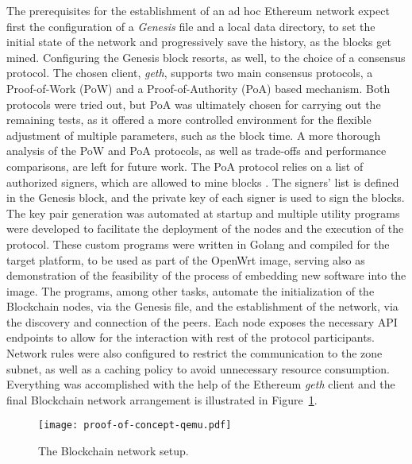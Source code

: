 The prerequisites for the establishment of an ad hoc Ethereum network expect first the configuration of a \emph{Genesis} file and a local data directory, to set the initial state of the network and progressively save the history, as the blocks get mined. Configuring the Genesis block resorts, as well, to the choice of a consensus protocol. The chosen client, \emph{geth}, supports two main consensus protocols, a Proof-of-Work (PoW) and a Proof-of-Authority (PoA) based mechanism. Both protocols were tried out, but PoA was ultimately chosen for carrying out the remaining tests, as it offered a more controlled environment for the flexible adjustment of multiple parameters, such as the block time. A more thorough analysis of the PoW and PoA protocols, as well as trade-offs and performance comparisons, are left for future work. The PoA protocol relies on a list of authorized signers, which are allowed to mine blocks \cite{clique-eth}. The signers' list is defined in the Genesis block, and the private key of each signer is used to sign the blocks. The key pair generation was automated at startup and multiple utility programs were developed to facilitate the deployment of the nodes and the execution of the protocol. These custom programs were written in Golang and compiled for the target platform, to be used as part of the OpenWrt image, serving also as demonstration of the feasibility of the process of embedding new software into the image. The programs, among other tasks, automate the initialization of the Blockchain nodes, via the Genesis file, and the establishment of the network, via the discovery and connection of the peers. Each node exposes the necessary API endpoints to allow for the interaction with rest of the protocol participants. Network rules were also configured to restrict the communication to the zone subnet, as well as a caching policy to avoid unnecessary resource consumption. Everything was accomplished with the help of the Ethereum \emph{geth} client and the final Blockchain network arrangement is illustrated in Figure~\ref{fig:pol-implementation:blockchain-network}.

\begin{figure}[h!]
    \begin{center}
    \texttt{[image: proof-of-concept-qemu.pdf]}
    \caption{The Blockchain network setup.}
    \label{fig:pol-implementation:blockchain-network}
    \end{center}
\end{figure}



